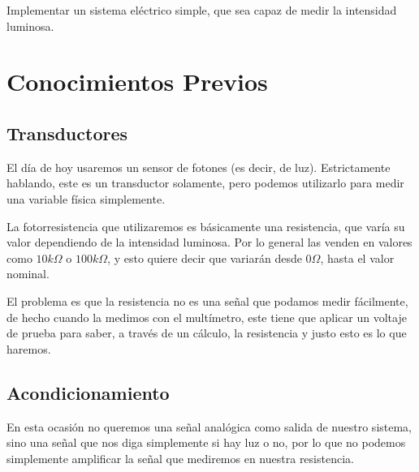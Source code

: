 	Implementar un sistema eléctrico simple, que sea capaz de medir la intensidad luminosa.


\section{Conocimientos Previos}


	\subsection{Transductores}

		El día de hoy usaremos un sensor de fotones (es decir, de luz). Estrictamente hablando, este es un transductor solamente, pero podemos utilizarlo para medir una variable física simplemente.

		La fotorresistencia que utilizaremos es básicamente una resistencia, que varía su valor dependiendo de la intensidad luminosa. Por lo general las venden en valores como $10 k \Omega$ o $100 k \Omega$, y esto quiere decir que variarán desde $0 \Omega$, hasta el valor nominal.

		El problema es que la resistencia no es una señal que podamos medir fácilmente, de hecho cuando la medimos con el multímetro, este tiene que aplicar un voltaje de prueba para saber, a través de un cálculo, la resistencia y justo esto es lo que haremos.


	\subsection{Acondicionamiento}

		En esta ocasión no queremos una señal analógica como salida de nuestro sistema, sino una señal que nos diga simplemente si hay luz o no, por lo que no podemos simplemente amplificar la señal que mediremos en nuestra resistencia.

